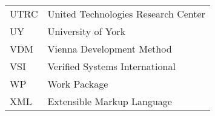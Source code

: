 \begin{longtable}{ll}
UTRC    & United Technologies Research Center\\
UY      & University of York\\
VDM     &Vienna Development Method\\
VSI     & Verified Systems International\\
WP	&Work Package\\
XML	&Extensible Markup Language\\
\end{longtable}
